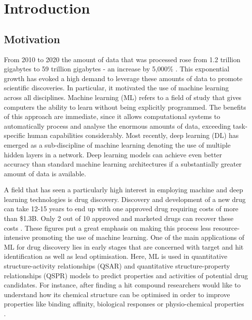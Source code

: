 \section{Introduction}
\subsection{Motivation}
From 2010 to 2020 the amount of data that was processed rose from 1.2 trillion gigabytes to 59 trillion gigabytes - an increase by 5,000\% \citep{data}. This exponential growth has evoked a high demand to leverage these amounts of data to promote scientific discoveries. In particular, it motivated the use of machine learning across all disciplines. Machine learning (ML) refers to a field of study that gives computers the ability to learn without being explicitly programmed. The benefits of this approach are immediate, since it allows computational systems to automatically process and analyse the enormous amounts of data, exceeding task-specific human capabilities considerably. 
Most recently, deep learning (DL) has emerged as a sub-discipline of machine learning denoting the use of multiple hidden layers in a network. Deep learning models can achieve even better accuracy than standard machine learning architectures if a substantially greater amount of data is available.

A field that has seen a particularly high interest in employing machine and deep learning technologies is drug discovery. Discovery and development of a new drug can take 12-15 years to end up with one approved drug requiring costs of more than \$1.3B. Only 2 out of 10 approved and marketed drugs can recover these costs \citep{hecht}. These figures put a great emphasis on making this process less resource-intensive promoting the use of machine learning. One of the main applications of ML for drug discovery lies in early stages that are concerned with target and hit identification as well as lead optimisation. Here, ML is used in  quantitative structure-activity relationships (QSAR) and quantitative structure-property relationships (QSPR) models to predict properties and activities of potential drug candidates. For instance, after finding a hit compound researchers would like to understand how its chemical structure can be optimised in order to improve properties like binding affinity, biological responses or physio-chemical properties \citep{LO20181538}. 

